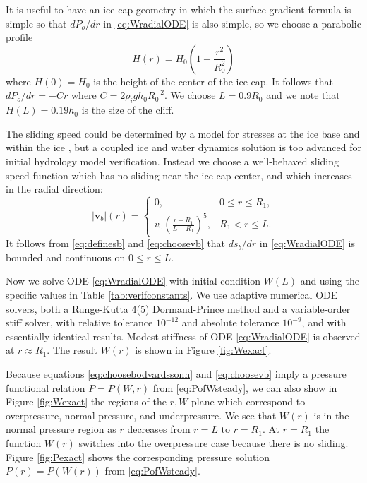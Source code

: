 \documentclass[gmd]{copernicus}   %
\newcommand\bv{\mathbf{v}}
\begin{document}
It is useful to have an ice cap geometry in which the surface gradient formula is simple so that $dP_o/dr$ in \eqref{eq:WradialODE} is also simple, so we choose a parabolic profile
\begin{equation}
H(r) = H_0 \left(1 - \frac{r^2}{R_0^2} \right) \label{eq:choosebodvardssonh}
\end{equation}
where $H(0)=H_0$ is the height of the center of the ice cap.  It follows that $dP_o/dr = - C r$ where $C=2\rho_i g h_0 R_0^{-2}$.  We choose $L=0.9 R_0$ and we note that $H(L)=0.19 h_0$ is the size of the cliff.

The sliding speed could be determined by a model for stresses at the ice base and within the ice \citep{GreveBlatter2009}, but a coupled ice and water dynamics solution is too advanced for initial hydrology model verification.  Instead we choose a well-behaved sliding speed function which has no sliding near the ice cap center, and which increases in the radial direction:
\begin{equation}
|\bv_b|(r) = \begin{cases} 0, & 0 \le r \le R_1, \\
                           v_0  \left(\frac{r-R_1}{L-R_1}\right)^5, & R_1 < r \le L.
             \end{cases}  \label{eq:choosevb}
\end{equation}
It follows from \eqref{eq:definesb} and \eqref{eq:choosevb} that $ds_b/dr$ in \eqref{eq:WradialODE} is bounded and continuous on $0\le r \le L$.

Now we solve ODE \eqref{eq:WradialODE} with initial condition $W(L)$ and using the specific values in Table \ref{tab:verifconstants}.  We use adaptive numerical ODE solvers, both a Runge-Kutta 4(5) Dormand-Prince method and a variable-order stiff solver, with relative tolerance $10^{-12}$ and absolute tolerance $10^{-9}$, and with essentially identical results.  Modest stiffness \citep{AscherPetzold} of ODE \eqref{eq:WradialODE} is observed at $r\approx R_1$.  The result $W(r)$ is shown in Figure \ref{fig:Wexact}.

Because equations \eqref{eq:choosebodvardssonh} and \eqref{eq:choosevb} imply a pressure functional relation $P=P(W,r)$ from \eqref{eq:PofWsteady}, we can also show in Figure \ref{fig:Wexact} the regions of the $r,W$ plane which correspond to overpressure, normal pressure, and underpressure.  We see that $W(r)$ is in the normal pressure region as $r$ decreases from $r=L$ to $r=R_1$.  At $r=R_1$ the function $W(r)$ switches into the overpressure case because there is no sliding.  Figure \ref{fig:Pexact} shows the corresponding pressure solution $P(r)=P(W(r))$ from \eqref{eq:PofWsteady}.
\end{document}
